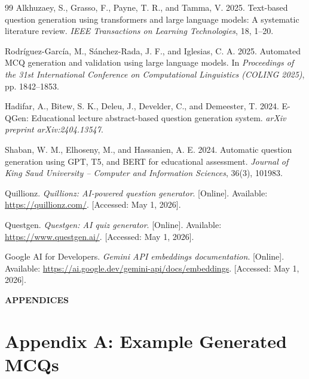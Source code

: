 \documentclass[12pt,a4paper]{article}
\begin{document}
\begin{thebibliography}{99}
Alkhuzaey, S., Grasso, F., Payne, T. R., and Tamma, V. 2025.
Text-based question generation using transformers and large language models:
A systematic literature review. \textit{IEEE Transactions on Learning
Technologies}, 18, 1--20.

Rodríguez-García, M., Sánchez-Rada, J. F., and Iglesias, C. A. 2025.
Automated MCQ generation and validation using large language models.
In \textit{Proceedings of the 31st International Conference on
Computational Linguistics (COLING 2025)}, pp. 1842--1853.

Hadifar, A., Bitew, S. K., Deleu, J., Develder, C., and Demeester, T. 2024.
E-QGen: Educational lecture abstract-based question generation system.
\textit{arXiv preprint arXiv:2404.13547}.

Shaban, W. M., Elhoseny, M., and Hassanien, A. E. 2024.
Automatic question generation using GPT, T5, and BERT for educational
assessment. \textit{Journal of King Saud University -- Computer and
Information Sciences}, 36(3), 101983.

Quillionz. \textit{Quillionz: AI-powered question generator}. [Online].
Available: \url{https://quillionz.com/}. [Accessed: May 1, 2026].

Questgen. \textit{Questgen: AI quiz generator}. [Online]. Available:
\url{https://www.questgen.ai/}. [Accessed: May 1, 2026].

Google AI for Developers. \textit{Gemini API embeddings documentation}.
[Online]. Available: \url{https://ai.google.dev/gemini-api/docs/embeddings}.
[Accessed: May 1, 2026].

\end{thebibliography}


\newpage
{}

\begin{center}
  \textbf{APPENDICES}
\end{center}

\vspace{1cm}

\section*{Appendix A: Example Generated MCQs}
\end{document}
